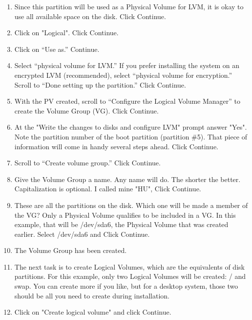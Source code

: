 \documentclass[12pt,notitlepage,onecolumn,oneside,openany]{memoir}
\begin{document}
\begin{enumerate}
\item \textsf{Since this partition will be used as a Physical Volume for LVM, it is okay to use all available space on the disk. Click Continue.}
 
\item \textsf{Click on "Logical". Click Continue.}
 
\item \textsf{Click on “Use as.” Continue.} 

\item \textsf{Select “physical volume for LVM.” If you prefer installing the system on an encrypted LVM (recommended), select “physical volume for encryption.” Scroll to “Done setting up the partition.” Click Continue.} 

\item \textsf{With the PV created, scroll to “Configure the Logical Volume Manager” to create the Volume Group (VG). Click Continue.}
 
\item \textsf{At the "Write the changes to disks and configure LVM" prompt answer "Yes". Note the partition number of the boot partition (partition \#5). That piece of information will come in handy several steps ahead. Click Continue.} 

\item \textsf{Scroll to “Create volume group.” Click Continue.} 

\item \textsf{Give the Volume Group a name. Any name will do. The shorter the better. Capitalization is optional.  I called mine "HU", Click Continue.}
 
\item \textsf{These are all the partitions on the disk. Which one will be made a member of the VG? Only a Physical Volume qualifies to be included in a VG. In this example, that will be /dev/sda6, the Physical Volume that was created earlier. Select /dev/sda6 and Click Continue.}
 
\item \textsf{The Volume Group has been created.} 

\item \textsf{The next task is to create Logical Volumes, which are the equivalents of disk partitions. For this example, only two Logical Volumes will be created: / and swap. You can create more if you like, but for a desktop system, those two should be all you need to create during installation.} 

\item \textsf{Click on "Create logical volume" and click Continue.}
 

\end{enumerate}
\end{document}
